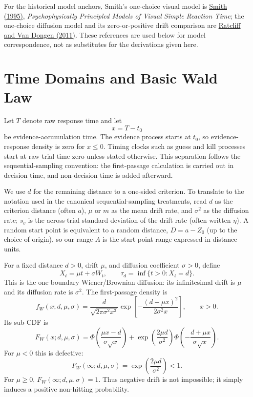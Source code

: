 \documentclass[12pt]{article}
\newcommand{\PhiN}{\Phi}
\begin{document}
For the historical model anchors, Smith's one-choice visual model is \href{https://doi.org/10.1037/0033-295X.102.3.567}{Smith (1995)}, \emph{Psychophysically Principled Models of Visual Simple Reaction Time}; the one-choice diffusion model and its zero-or-positive drift comparison are \href{https://doi.org/10.1073/pnas.1100483108}{Ratcliff and Van Dongen (2011)}. These references are used below for model correspondence, not as substitutes for the derivations given here.

\section{Time Domains and Basic Wald Law}
Let $T$ denote raw response time and let
\[
  x=T-t_0
\]
be evidence-accumulation time. The evidence process starts at $t_0$, so evidence-response density is zero for $x\le 0$. Timing clocks such as guess and kill processes start at raw trial time zero unless stated otherwise. This separation follows the sequential-sampling convention: the first-passage calculation is carried out in decision time, and non-decision time is added afterward.

We use $d$ for the remaining distance to a one-sided criterion. To translate to the notation used in the canonical sequential-sampling treatments, read $d$ as the criterion distance (often $a$), $\mu$ or $m$ as the mean drift rate, and $\sigma^2$ as the diffusion rate; $s_v$ is the across-trial standard deviation of the drift rate (often written $\eta$). A random start point is equivalent to a random distance, $D=a-Z_0$ (up to the choice of origin), so our range $A$ is the start-point range expressed in distance units.

For a fixed distance $d>0$, drift $\mu$, and diffusion coefficient $\sigma>0$, define
\[
  X_t=\mu t+\sigma W_t,
  \qquad
  \tau_d=\inf\{t>0:X_t=d\}.
\]
This is the one-boundary Wiener/Brownian diffusion: its infinitesimal drift is $\mu$ and its diffusion rate is $\sigma^2$. The first-passage density is
\begin{equation}
  f_W(x;d,\mu,\sigma)=
  \frac{d}{\sqrt{2\pi\sigma^2x^3}}
  \exp\!\left[-\frac{(d-\mu x)^2}{2\sigma^2x}\right],
  \qquad x>0.
\end{equation}
Its sub-CDF is
\begin{equation}
  F_W(x;d,\mu,\sigma)=
  \PhiN\!\left(\frac{\mu x-d}{\sigma\sqrt{x}}\right)
  +\exp\!\left(\frac{2\mu d}{\sigma^2}\right)
  \PhiN\!\left(-\frac{d+\mu x}{\sigma\sqrt{x}}\right).
  \label{eq:wald-cdf}
\end{equation}
For $\mu<0$ this is defective:
\begin{equation}
  F_W(\infty;d,\mu,\sigma)=\exp\!\left(\frac{2\mu d}{\sigma^2}\right)<1.
\end{equation}
For $\mu\ge 0$, $F_W(\infty;d,\mu,\sigma)=1$. Thus negative drift is not impossible; it simply induces a positive non-hitting probability.
\end{document}
